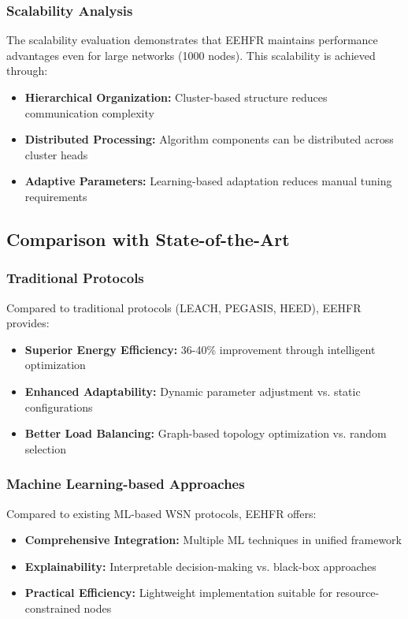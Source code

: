 \documentclass[conference]{IEEEtran}
\begin{document}
\subsubsection{Scalability Analysis}

The scalability evaluation demonstrates that EEHFR maintains performance advantages even for large networks (1000 nodes). This scalability is achieved through:

\begin{itemize}
    \item \textbf{Hierarchical Organization:} Cluster-based structure reduces communication complexity
    \item \textbf{Distributed Processing:} Algorithm components can be distributed across cluster heads
    \item \textbf{Adaptive Parameters:} Learning-based adaptation reduces manual tuning requirements
\end{itemize}

\subsection{Comparison with State-of-the-Art}

\subsubsection{Traditional Protocols}

Compared to traditional protocols (LEACH, PEGASIS, HEED), EEHFR provides:

\begin{itemize}
    \item \textbf{Superior Energy Efficiency:} 36-40\% improvement through intelligent optimization
    \item \textbf{Enhanced Adaptability:} Dynamic parameter adjustment vs. static configurations
    \item \textbf{Better Load Balancing:} Graph-based topology optimization vs. random selection
\end{itemize}

\subsubsection{Machine Learning-based Approaches}

Compared to existing ML-based WSN protocols, EEHFR offers:

\begin{itemize}
    \item \textbf{Comprehensive Integration:} Multiple ML techniques in unified framework
    \item \textbf{Explainability:} Interpretable decision-making vs. black-box approaches
    \item \textbf{Practical Efficiency:} Lightweight implementation suitable for resource-constrained nodes
\end{itemize}
\end{document}
